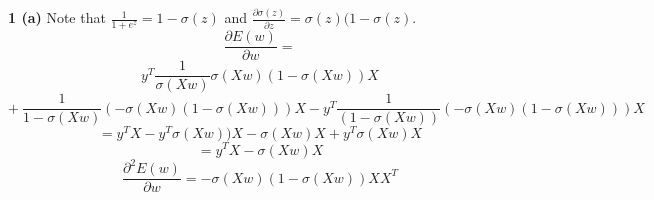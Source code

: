 \documentclass[12 pt]{article}        	%
\begin{document}
\textbf{1 (a)} Note that $\frac{1}{1 + e^z} = 1 - \sigma(z) $ and $ \frac{\partial \sigma(z)}{\partial z} = \sigma(z) (1 - \sigma(z)$. \\
\[ 
  \frac{\partial{E(w)}}{\partial w} = 
\]
\[
  y^T \frac{1}{\sigma(Xw)} \sigma(Xw) (1-\sigma(Xw)) X
\]
\[
  + \: \frac{1}{1-\sigma(Xw)}(- \sigma(Xw)(1-\sigma(Xw))) X
  - y^T \frac{1}{(1-\sigma(Xw))}(-\sigma(Xw)(1-\sigma(Xw))) X
\]
\[
  = y^T X - y^T \sigma(Xw)) X - \sigma(Xw) X + y^T \sigma(Xw) X
\]
\[
  = y^T X - \sigma(Xw) X 
\]
\[
  \frac{\partial^2 E(w)}{\partial w} = - \sigma(Xw)(1 - \sigma(Xw)) X X^T
\]
\end{document}
